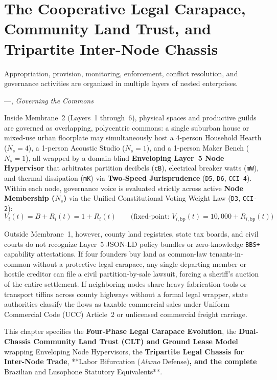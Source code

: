 \chapter{The Cooperative Legal Carapace, Community Land Trust, and Tripartite Inter-Node Chassis}
\label{ch:l7-corporate-shell-defense}

\epigraph{Appropriation, provision, monitoring, enforcement, conflict resolution, and governance activities are organized in multiple layers of nested enterprises.}{---\textcite{ostrom1990}, \textit{Governing the Commons}}

Inside Membrane~2 (Layers~1 through~6), physical spaces and productive guilds are governed as overlapping, polycentric commons: a single suburban house or mixed-use urban floorplate may simultaneously host a 4-person Household Hearth ($N_s = 4$), a 1-person Acoustic Studio ($N_s = 1$), and a 1-person Maker Bench ($N_s = 1$), all wrapped by a domain-blind \textbf{Enveloping Layer~5 Node Hypervisor} that arbitrates partition decibels (\texttt{cB}), electrical breaker watts (\texttt{mW}), and thermal dissipation (\texttt{mK}) via \textbf{Two-Speed Jurisprudence} (\texttt{D5}, \texttt{D6}, \texttt{CCI-4}). Within each node, governance voice is evaluated strictly across active \textbf{Node Membership ($N_s$)} via the Unified Constitutional Voting Weight Law (\texttt{D3}, \texttt{CCI-2}):
\begin{equation}
V_i(t) = B + R_i(t) = 1 + R_i(t) \qquad \bigl(\text{fixed-point: } V_{i,\mathrm{bp}}(t) = 10{,}000 + R_{i,\mathrm{bp}}(t)\bigr)
\label{eq:ch5-unified-voting}
\end{equation}

Outside Membrane~1, however, county land registries, state tax boards, and civil courts do not recognize Layer~5 JSON-LD policy bundles or zero-knowledge \texttt{BBS+} capability attestations. If four founders buy land as common-law tenants-in-common without a protective legal carapace, any single departing member or hostile creditor can file a civil partition-by-sale lawsuit, forcing a sheriff's auction of the entire settlement. If neighboring nodes share heavy fabrication tools or transport tiffins across county highways without a formal legal wrapper, state authorities classify the flows as taxable commercial sales under Uniform Commercial Code (UCC) Article~2 or unlicensed commercial freight carriage.

This chapter specifies the \textbf{Four-Phase Legal Carapace Evolution}, the \textbf{Dual-Chassis Community Land Trust (CLT) and Ground Lease Model} wrapping Enveloping Node Hypervisors, the \textbf{Tripartite Legal Chassis for Inter-Node Trade}, **Labor Bifurcation (\textit{Alamo} Defense)\textbf{, and the complete }Brazilian and Lusophone Statutory Equivalents**.

